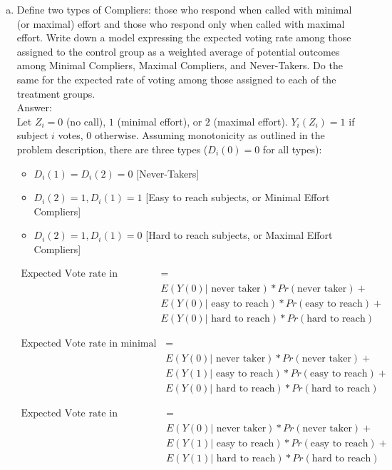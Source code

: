 \documentclass[11pt,notitlepage]{article}\usepackage[]{graphicx}\usepackage[]{color}
\begin{document}
\begin{enumerate}[a)]
\item Define two types of Compliers: those who respond when called with minimal (or maximal) effort and those who respond only when called with maximal effort. Write down a model expressing the expected voting rate among those assigned to the control group as a weighted average of potential outcomes among Minimal Compliers, Maximal Compliers, and Never-Takers. Do the same for the expected rate of voting among those assigned to each of the treatment groups.\\
Answer:\\
Let $Z_i = 0$ (no call), $1$ (minimal effort), or $2$ (maximal effort). $Y_i(Z_i) =1$ if subject $i$ votes, $0$ otherwise. Assuming monotonicity as outlined in the problem description, there are three types ($D_i(0)=0$ for all types): 
\begin{itemize}
\item $D_i(1) = D_i(2) = 0$   [Never-Takers]
\item $D_i(2) = 1, D_i(1)=1$	[Easy to reach subjects, or Minimal Effort Compliers]
\item $D_i(2) = 1, D_i(1) = 0$	[Hard to reach subjects, or Maximal Effort Compliers]
\end{itemize}

\begin{align*}
\text{Expected Vote rate in Control (EV, Control)} &= \\
&E(Y(0)|\text{ never taker})*Pr(\text{never taker}) + \\
&E(Y(0)|\text{ easy to reach})*Pr(\text{easy to reach}) + \\
&E(Y(0)|\text{ hard to reach})*Pr(\text{hard to reach})
\end{align*}

\begin{align*}
\text{Expected Vote rate in minimal effort (EV, minimal)} &= \\
&E(Y(0)|\text{ never taker})*Pr(\text{never taker}) + \\
&E(Y(1)|\text{ easy to reach})*Pr(\text{easy to reach}) + \\
&E(Y(0)|\text{ hard to reach})*Pr(\text{hard to reach})
\end{align*}

\begin{align*}
\text{Expected Vote rate in maximal effort (EV, maximal)} &= \\
&E(Y(0)|\text{ never taker})*Pr(\text{never taker}) + \\
&E(Y(1)|\text{ easy to reach})*Pr(\text{easy to reach}) + \\
&E(Y(1)|\text{ hard to reach})*Pr(\text{hard to reach})
\end{align*}



\end{enumerate}
\end{document}
